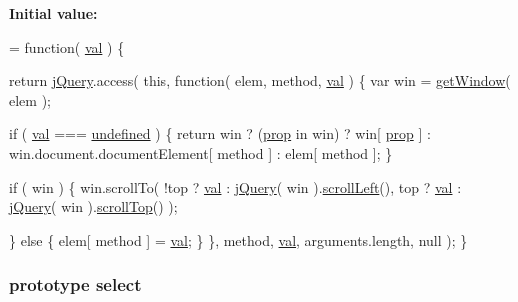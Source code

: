 {\bfseries Initial value\-:}
\begin{DoxyCode}
= \textcolor{keyword}{function}( \hyperlink{jquery-1_810_82-vsdoc_8js_a0888cacd53defa08fbb4972d54ece4b0}{val} ) \{


        \textcolor{keywordflow}{return} \hyperlink{jquery-1_810_82-vsdoc_8js_add5237586d970a38a81f990e8eb28c6c}{jQuery}.access( \textcolor{keyword}{this}, \textcolor{keyword}{function}( elem, method, \hyperlink{jquery-1_810_82-vsdoc_8js_a0888cacd53defa08fbb4972d54ece4b0}{val} ) \{
            var win = \hyperlink{jquery-1_810_82_8js_ab8e6e1fb3b8b51b6afe437c63df0e09f}{getWindow}( elem );

            \textcolor{keywordflow}{if} ( \hyperlink{jquery-1_810_82-vsdoc_8js_a0888cacd53defa08fbb4972d54ece4b0}{val} === \hyperlink{jquery-1_810_82-vsdoc_8js_a08113a236cc18d2a9d5ce27e638012be}{undefined} ) \{
                \textcolor{keywordflow}{return} win ? (\hyperlink{jquery-1_810_82-vsdoc_8js_af17be84954030af6c2286f5da385d41b}{prop} in win) ? win[ \hyperlink{jquery-1_810_82-vsdoc_8js_af17be84954030af6c2286f5da385d41b}{prop} ] :
                    win.document.documentElement[ method ] :
                    elem[ method ];
            \}

            \textcolor{keywordflow}{if} ( win ) \{
                win.scrollTo(
                    !top ? \hyperlink{jquery-1_810_82-vsdoc_8js_a0888cacd53defa08fbb4972d54ece4b0}{val} : \hyperlink{jquery-1_810_82-vsdoc_8js_add5237586d970a38a81f990e8eb28c6c}{jQuery}( win ).\hyperlink{jquery-1_810_82-vsdoc_8js_accc573ddf4124d723e9a6da272bb24f2}{scrollLeft}(),
                    top ? \hyperlink{jquery-1_810_82-vsdoc_8js_a0888cacd53defa08fbb4972d54ece4b0}{val} : \hyperlink{jquery-1_810_82-vsdoc_8js_add5237586d970a38a81f990e8eb28c6c}{jQuery}( win ).\hyperlink{jquery-1_810_82-vsdoc_8js_a1b81b50a7190916ff4f07febc824b85d}{scrollTop}()
                );

            \} \textcolor{keywordflow}{else} \{
                elem[ method ] = \hyperlink{jquery-1_810_82-vsdoc_8js_a0888cacd53defa08fbb4972d54ece4b0}{val};
            \}
        \}, method, \hyperlink{jquery-1_810_82-vsdoc_8js_a0888cacd53defa08fbb4972d54ece4b0}{val}, arguments.length, null );
    \}
\end{DoxyCode}
\hypertarget{jquery-1_810_82-vsdoc_8js_a861f73402c6bb8457b04e4c36686ce8c}{
\subsubsection[{select}]{ {\bf prototype} select}}\label{jquery-1_810_82-vsdoc_8js_a861f73402c6bb8457b04e4c36686ce8c}

